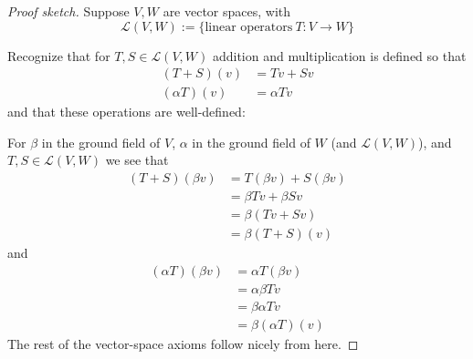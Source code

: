 \begin{proof}[Proof sketch]
    Suppose $V,W$ are vector spaces, with 
    \[
        \mathcal L(V,W) := \{\text{linear operators} \ 
        T : V \to W\}
    \]

    Recognize that for $T,S \in \mathcal L(V,W)$ addition 
    and multiplication is defined so that 
    \begin{align*}
        (T+S)(v) &= Tv + Sv \\ 
        (\alpha T)(v) &= \alpha T v
    \end{align*}
    and that these operations are well-defined: 

    For $\beta$ in the ground field of $V$, $\alpha$ in the 
    ground field of $W$ (and $\mathcal L(V,W)$), and 
    $T,S \in \mathcal L(V,W)$ we see that 
    \begin{align*}
        (T+S)(\beta v) &= T(\beta v) + S(\beta v) \\ 
                       &= \beta T v + \beta S v \\ 
                       &= \beta (T v + S v) \\ 
                       &= \beta (T+S)(v)
    \end{align*}
    and 
    \begin{align*}
        (\alpha T)(\beta v) &= \alpha T (\beta v) \\ 
                           &= \alpha \beta T v \\ 
                           &= \beta \alpha T v \\ 
                           &= \beta (\alpha T)(v)
    \end{align*}
    The rest of the vector-space axioms follow nicely from here.
\end{proof}

